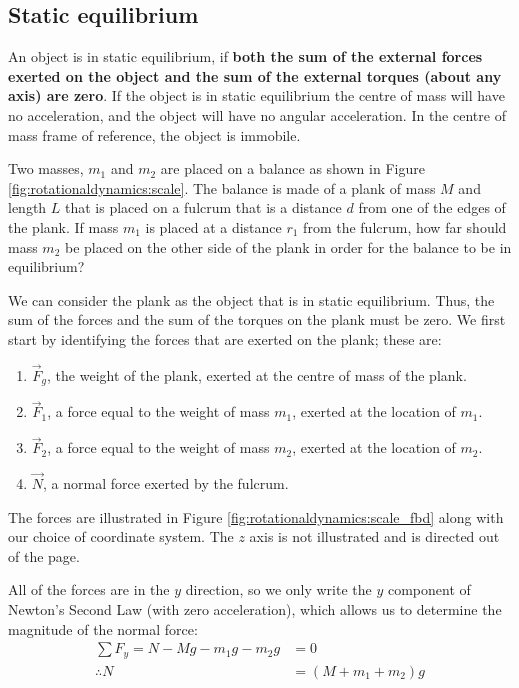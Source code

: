 \subsection{Static equilibrium}
An object is in static equilibrium, if \textbf{both the sum of the external forces exerted on the object and the sum of the external torques (about any axis) are zero}. If the object is in static equilibrium the centre of mass will have no acceleration, and the object will have no angular acceleration. In the centre of mass frame of reference, the object is immobile. 
\vspace{-0.25cm}
\begin{example}{

 Two masses, $m_1$ and $m_2$ are placed on a balance as shown in Figure \ref{fig:rotationaldynamics:scale}. The balance is made of a plank of mass $M$ and length $L$ that is placed on a fulcrum that is a distance $d$ from one of the edges of the plank. If mass $m_1$ is placed at a distance $r_1$ from the fulcrum, how far should mass $m_2$ be placed on the other side of the plank in order for the balance to be in equilibrium?}
We can consider the plank as the object that is in static equilibrium. Thus, the sum of the forces and the sum of the torques on the plank must be zero. We first start by identifying the forces that are exerted on the plank; these are:
\begin{enumerate}
\item $\vec F_g$, the weight of the plank, exerted at the centre of mass of the plank.
\item $\vec F_1$, a force equal to the weight of mass $m_1$, exerted at the location of $m_1$. 
\item $\vec F_2$, a force equal to the weight of mass $m_2$, exerted at the location of $m_2$.
\item $\vec N$, a normal force exerted by the fulcrum.
\end{enumerate} 
The forces are illustrated in Figure \ref{fig:rotationaldynamics:scale_fbd} along with our choice of coordinate system. The $z$ axis is not illustrated and is directed out of the page. 

All of the forces are in the $y$ direction, so we only write the $y$ component of Newton's Second Law (with zero acceleration), which allows us to determine the magnitude of the normal force:
\begin{align*}
\sum F_y = N - Mg -m_1g - m_2 g &=0\\
\therefore N &= (M+m_1+m_2) g
\end{align*}


\end{example}
